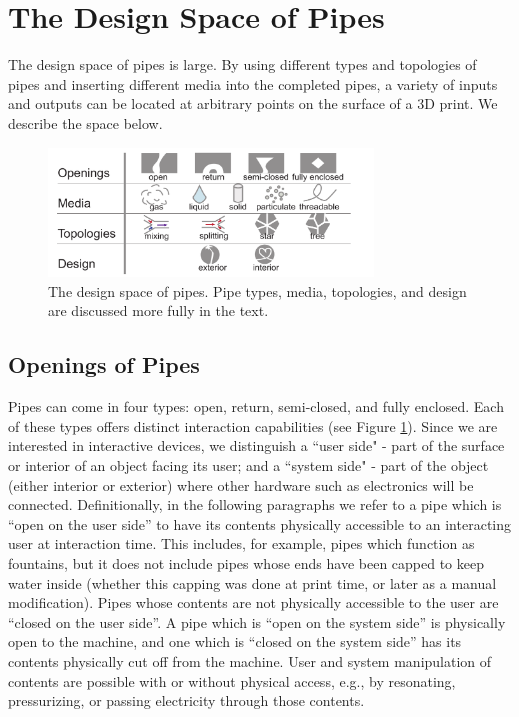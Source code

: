 \section{The Design Space of Pipes}
The design space of pipes is large.  By using different types and topologies of pipes and inserting different media into the completed pipes, a variety of inputs and outputs can be located at arbitrary points on the surface of a 3D print.  We describe the space below.

\begin{figure}[h!]
\centering
    \includegraphics[width=3.4in]{figures/tubespace.pdf}
\caption{The design space of pipes.  Pipe types, media, topologies, and design are discussed more fully in the text.}
\label{fig:pipespace}
\end{figure}

\subsection{Openings of Pipes}

Pipes can come in four types: open, return, semi-closed, and fully enclosed.  Each of these types offers distinct interaction capabilities (see Figure \ref{fig:pipespace}).  Since we are interested in interactive devices, we distinguish a ``user side" - part of the surface or interior of an object facing its user; and a ``system side" - part of the object (either interior or exterior) where other hardware such as electronics will be connected.  Definitionally, in the following paragraphs we refer to a pipe which is ``open on the user side'' to have its contents physically accessible to an interacting user at interaction time.  This includes, for example, pipes which function as fountains, but it does not include pipes whose ends have been capped to keep water inside (whether this capping was done at print time, or later as a manual modification).  Pipes whose contents are not physically accessible to the user are ``closed on the user side''.  A pipe which is ``open on the system side'' is physically open to the machine, and one which is ``closed on the system side'' has its contents physically cut off from the machine.  User and system manipulation of contents are possible with or without physical access, e.g., by resonating, pressurizing, or passing electricity through those contents. 

